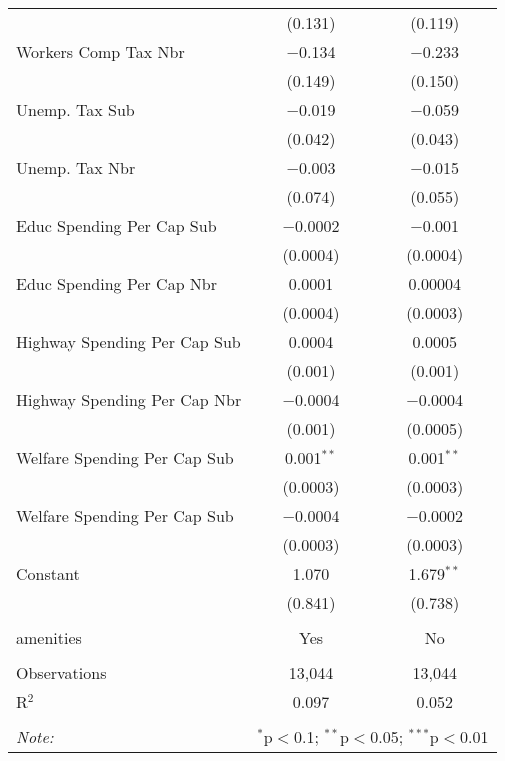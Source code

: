 \begin{table}[!htbp]
\begin{tabular}{@{\extracolsep{5pt}}lcc}
  & (0.131) & (0.119) \\ 
  Workers Comp Tax Nbr & $-$0.134 & $-$0.233 \\ 
  & (0.149) & (0.150) \\ 
  Unemp. Tax Sub & $-$0.019 & $-$0.059 \\ 
  & (0.042) & (0.043) \\ 
  Unemp. Tax Nbr & $-$0.003 & $-$0.015 \\ 
  & (0.074) & (0.055) \\ 
  Educ Spending Per Cap Sub & $-$0.0002 & $-$0.001 \\ 
  & (0.0004) & (0.0004) \\ 
  Educ Spending Per Cap Nbr & 0.0001 & 0.00004 \\ 
  & (0.0004) & (0.0003) \\ 
  Highway Spending Per Cap Sub & 0.0004 & 0.0005 \\ 
  & (0.001) & (0.001) \\ 
  Highway Spending Per Cap Nbr & $-$0.0004 & $-$0.0004 \\ 
  & (0.001) & (0.0005) \\ 
  Welfare Spending Per Cap Sub & 0.001$^{**}$ & 0.001$^{**}$ \\ 
  & (0.0003) & (0.0003) \\ 
  Welfare Spending Per Cap Sub & $-$0.0004 & $-$0.0002 \\ 
  & (0.0003) & (0.0003) \\ 
  Constant & 1.070 & 1.679$^{**}$ \\ 
  & (0.841) & (0.738) \\ 
 \hline \\[-1.8ex] 
amenities & Yes & No \\ 
\hline \\[-1.8ex] 
Observations & 13,044 & 13,044 \\ 
R$^{2}$ & 0.097 & 0.052 \\ 
\hline 
\hline \\[-1.8ex] 
\textit{Note:}  & \multicolumn{2}{r}{$^{*}$p$<$0.1; $^{**}$p$<$0.05; $^{***}$p$<$0.01} \\ 
\end{tabular} 
\end{table} 

